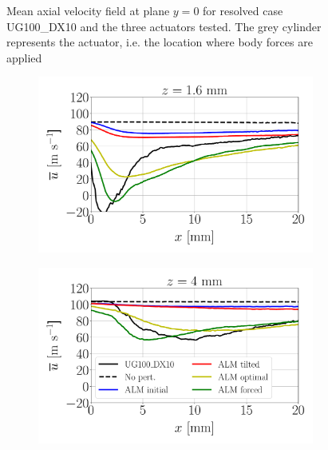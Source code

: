 \begin{figure}[h!]	
	\centering	{}
	\vspace*{-0.1in}
	\caption{Mean axial velocity field at plane $y = 0$ for resolved case UG100\_DX10 and the three actuators tested. The grey cylinder represents the actuator, i.e. the location where body forces are applied}
	\label{fig:ALM_gas_fields_plane_Y}
\end{figure}

\clearpage

\begin{figure}[ht]
\flushleft
\begin{subfigure}[b]{0.45\textwidth}
	\centering
   \includegraphics[scale=0.25]{./part2_developments/figures_ch6_lagrangian_JICF/gas_field_initial_conditions/ALM_line_y0_along_x_z01p6}
\end{subfigure}
\hspace{0.4in}
\begin{subfigure}[b]{0.45\textwidth}
	\centering
   \includegraphics[scale=0.25]{./part2_developments/figures_ch6_lagrangian_JICF/gas_field_initial_conditions/ALM_line_y0_along_x_z04p0}

\end{subfigure}
\end{figure}
